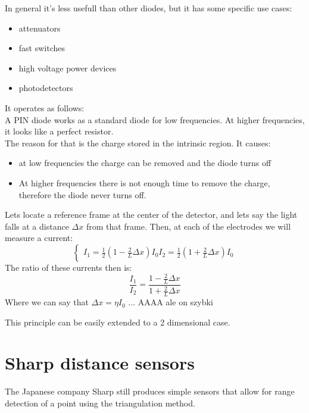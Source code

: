 In general it's less usefull than other diodes, but it has some specific use cases:
\begin{itemize}
        \item attenuators
        \item fast switches
        \item high voltage power devices
        \item photodetectors
        
\end{itemize}
It operates as follows:\\
A PIN diode works as a standard diode for low frequencies. At higher frequencies, it looks like a perfect resistor.\\
The reason for that is the charge stored in the intrinsic region. It causes:
\begin{itemize}
        \item at low frequencies the charge can be removed and the diode turns off
        \item At higher frequencies there is not enough time to remove the charge, therefore the diode never turns off.
\end{itemize}


{
    Lets locate a reference frame at the center of the detector, and lets say the light falls at a distance $\Delta x$ from that frame. Then, at each of the electrodes we will measure a current:
     \begin{equation}
        \begin{cases}
            I_1=\frac{1}{2}(1-\frac{2}{L}\Delta x)I_0
            I_2=\frac{1}{2}(1+\frac{2}{L}\Delta x)I_0
        \end{cases}
    \end{equation}
    The ratio of these currents then is:
    \begin{equation}
        \frac{I_1}{I_2} = \frac{1-\frac{2}{L}\Delta x}{1+\frac{2}{L}\Delta x}
    \end{equation}
    Where we can say that $\Delta x = \eta I_0$
    ... AAAA ale on szybki
}

This principle can be easily extended to a 2 dimensional case.


\section{Sharp distance sensors}
The Japanese company Sharp still produces simple sensors that allow for range detection of a point using the triangulation method.
